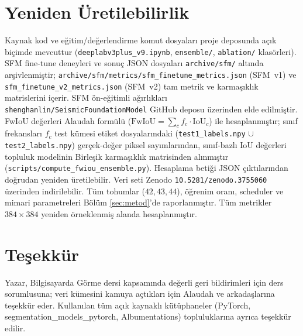 \documentclass[conference,a4paper,10pt]{IEEEtran}
\begin{document}
\section*{Yeniden Üretilebilirlik}

Kaynak kod ve eğitim/değerlendirme komut dosyaları proje deposunda
açık biçimde mevcuttur (\texttt{deeplabv3plus\_v9.ipynb},
\texttt{ensemble/}, \texttt{ablation/} klasörleri). SFM fine-tune
deneyleri ve sonuç JSON dosyaları \texttt{archive/sfm/} altında
arşivlenmiştir; \texttt{archive/sfm/metrics/sfm\_finetune\_metrics.json}
(SFM~v1) ve \texttt{sfm\_finetune\_v2\_metrics.json} (SFM~v2) tam metrik
ve karmaşıklık matrislerini içerir. SFM ön-eğitimli ağırlıkları
\texttt{shenghanlin/SeismicFoundationModel} GitHub deposu üzerinden
elde edilmiştir. FwIoU değerleri Alaudah formülü
($\text{FwIoU} = \sum_{c} f_c \cdot \text{IoU}_c$) ile hesaplanmıştır;
sınıf frekansları $f_c$ test kümesi etiket dosyalarındaki (\texttt{test1\_labels.npy}
$\cup$ \texttt{test2\_labels.npy}) gerçek-değer piksel sayımlarından, sınıf-bazlı
IoU değerleri topluluk modelinin Birleşik karmaşıklık matrisinden alınmıştır
(\texttt{scripts/compute\_fwiou\_ensemble.py}). Hesaplama betiği JSON
çıktılarından doğrudan yeniden üretilebilir. Veri seti Zenodo
\texttt{10.5281/zenodo.3755060} üzerinden indirilebilir. Tüm tohumlar
($42, 43, 44$), öğrenim oranı, scheduler ve mimari parametreleri Bölüm
\ref{sec:metod}'de raporlanmıştır. Tüm metrikler $384 \times 384$
yeniden örneklenmiş alanda hesaplanmıştır.

\section*{Teşekkür}

Yazar, Bilgisayarda Görme dersi kapsamında değerli geri bildirimleri için
ders sorumlusuna; veri kümesini kamuya açtıkları için Alaudah ve
arkadaşlarına teşekkür eder. Kullanılan tüm açık kaynaklı kütüphaneler
(PyTorch, segmentation\_models\_pytorch, Albumentations) topluluklarına
ayrıca teşekkür edilir.
\end{document}
